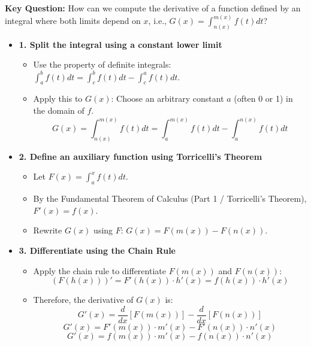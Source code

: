 \begin{cascade}
	\textbf{Key Question:} How can we compute the derivative of a function defined by an integral where both limits depend on $x$, i.e., $G(x) = \int_{n(x)}^{m(x)} f(t) dt$?
	\begin{itemize}
		\item
		      \textbf{1. Split the integral using a constant lower limit}
		      \begin{itemize}
			      \item Use the property of definite integrals: $\int_a^b f(t) dt = \int_c^b f(t) dt - \int_c^a f(t) dt$.
			      \item Apply this to $G(x)$: Choose an arbitrary constant $a$ (often 0 or 1) in the domain of $f$.
			            \[ G(x) = \int_{n(x)}^{m(x)} f(t) dt = \int_a^{m(x)} f(t) dt - \int_a^{n(x)} f(t) dt \]
		      \end{itemize}

		\item
		      \textbf{2. Define an auxiliary function using Torricelli's Theorem}
		      \begin{itemize}
			      \item Let $F(x) = \int_a^x f(t) dt$.
			      \item By the Fundamental Theorem of Calculus (Part 1 / Torricelli's Theorem), $F'(x) = f(x)$.
			      \item Rewrite $G(x)$ using $F$: $G(x) = F(m(x)) - F(n(x))$.
		      \end{itemize}

		\item
		      \textbf{3. Differentiate using the Chain Rule}
		      \begin{itemize}
			      \item Apply the chain rule to differentiate $F(m(x))$ and $F(n(x))$:
			            \[ (F(h(x)))' = F'(h(x)) \cdot h'(x) = f(h(x)) \cdot h'(x) \]
			      \item Therefore, the derivative of $G(x)$ is:
			            \[ G'(x) = \frac{d}{dx}[F(m(x))] - \frac{d}{dx}[F(n(x))] \]
			            \[ G'(x) = F'(m(x)) \cdot m'(x) - F'(n(x)) \cdot n'(x) \]
			            \[ G'(x) = f(m(x)) \cdot m'(x) - f(n(x)) \cdot n'(x) \]
		      \end{itemize}


\end{itemize}
\end{cascade}
